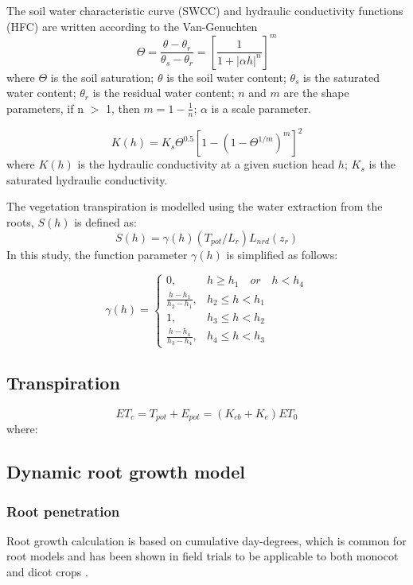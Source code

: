 The soil water characteristic curve (SWCC) and hydraulic conductivity functions (HFC) are written according to the Van-Genuchten \cite{Genuchten1980A}
\begin{equation}\Theta=\frac{\theta-\theta_r}{\theta_s-\theta_r}=[\frac{1}{1+|\alpha h|^n}]^m\end{equation}
where $\Theta$ is the soil saturation; $\theta$ is the soil water content; $\theta_s$ is the saturated water content; $\theta_r$ is the residual water content; $n$ and $m$ are the shape parameters, if n $>$ 1, then $m = 1 - \frac{1}{n}$; $\alpha$ is a scale parameter.

\begin{equation}K(h) = K_s \Theta^{0.5}[1-(1-\Theta^{1/m})^m]^2\end{equation}
where $K(h)$ is the hydraulic conductivity at a given suction head $h$; $K_s$ is the saturated hydraulic conductivity. 

The vegetation transpiration is modelled using the water extraction from the roots, $S(h)$ is defined as:
\begin{equation}S(h)=\gamma(h)(T_{pot}/L_r)L_{nrd}(z_r)\end{equation}
In this study, the function parameter $\gamma(h)$ is simplified as follows:

\begin{equation}
\gamma(h)= \begin{cases}
0, & h \geq h_1 \quad or \quad h < h_4 \\
\frac{h-h_1}{h_2-h_1}, & h_2 \leq h < h_1 \\
1, & h_3 \leq h < h_2 \\
\frac{h-h_4}{h_3-h_4}, & h_4 \leq h < h_3 
\end{cases}
\end{equation}

\subsection{Transpiration}
\begin{equation}ET_c=T_{pot}+E_{pot}=(K_{cb}+K_e)ET_0\end{equation}
where:

\subsection{Dynamic root growth model}
\subsubsection{Root penetration}
Root growth calculation is based on cumulative day-degrees, which is common for root models and has been shown in field trials to be applicable to both monocot and dicot crops \cite{PedersenModelling}. 

